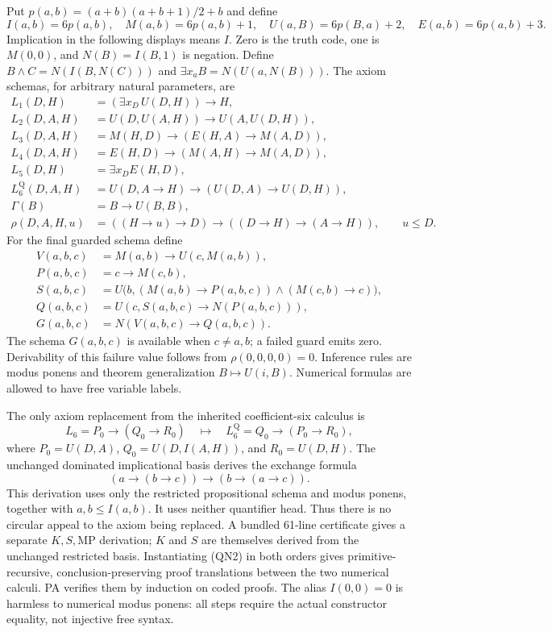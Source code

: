 Put $p(a,b)=(a+b)(a+b+1)/2+b$ and define
\[
 I(a,b)=6p(a,b),\quad M(a,b)=6p(a,b)+1,\quad
 U(a,B)=6p(B,a)+2,\quad E(a,b)=6p(a,b)+3.
\]
Implication in the following displays means $I$. Zero is the truth code,
one is $M(0,0)$, and $N(B)=I(B,1)$ is negation. Define
$B\wedge C=N(I(B,N(C)))$ and
$\exists x_aB=N(U(a,N(B)))$.
The axiom schemas, for arbitrary natural parameters, are
\begin{align*}
 L_1(D,H)&=(\exists x_D\,U(D,H))\to H,\\
 L_2(D,A,H)&=U(D,U(A,H))\to U(A,U(D,H)),\\
 L_3(D,A,H)&=M(H,D)\to(E(H,A)\to M(A,D)),\\
 L_4(D,A,H)&=E(H,D)\to(M(A,H)\to M(A,D)),\\
 L_5(D,H)&=\exists x_D E(H,D),\\
 L_6^{\mathrm Q}(D,A,H)&=U(D,A\to H)\to(U(D,A)\to U(D,H)),\\
 \Gamma(B)&=B\to U(B,B),\\
 \rho(D,A,H,u)&=((H\to u)\to D)\to((D\to H)\to(A\to H)),
 \qquad u\le D.
\end{align*}
For the final guarded schema define
\begin{align*}
 V(a,b,c)&=M(a,b)\to U(c,M(a,b)),\\
 P(a,b,c)&=c\to M(c,b),\\
 S(a,b,c)&=U\bigl(b,(M(a,b)\to P(a,b,c))\wedge(M(c,b)\to c)\bigr),\\
 Q(a,b,c)&=U(c,S(a,b,c)\to N(P(a,b,c))),\\
 G(a,b,c)&=N(V(a,b,c)\to Q(a,b,c)).
\end{align*}
The schema $G(a,b,c)$ is available when $c\ne a,b$; a failed guard emits
zero. Derivability of this failure value follows from
$\rho(0,0,0,0)=0$. Inference rules are
modus ponens and theorem generalization $B\mapsto U(i,B)$. Numerical
formulas are allowed to have free variable labels.

The only axiom replacement from the inherited coefficient-six calculus is
\[
 L_6= P_0\to(Q_0\to R_0)
 \quad\longmapsto\quad
 L_6^{\mathrm Q}=Q_0\to(P_0\to R_0),
\]
where $P_0=U(D,A)$, $Q_0=U(D,I(A,H))$, and $R_0=U(D,H)$.
The unchanged dominated implicational basis derives the exchange formula
\[
 (a\to(b\to c))\to(b\to(a\to c)).                 \tag{QN2}
\]
This derivation uses only the restricted propositional schema and modus
ponens, together with $a,b\le I(a,b)$. It uses neither quantifier
head. Thus there is no circular appeal to the axiom being replaced.
A bundled 61-line certificate gives a separate $K,S,\mathrm{MP}$ derivation;
$K$ and $S$ are themselves derived from the unchanged restricted basis.
Instantiating (QN2) in both orders gives primitive-recursive,
conclusion-preserving proof translations between the two numerical
calculi. PA verifies them by induction on coded proofs.
The alias $I(0,0)=0$ is harmless to numerical modus ponens: all steps
require the actual constructor equality, not injective free syntax.

